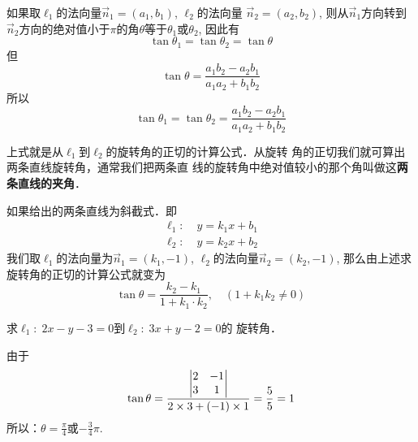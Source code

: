 \begin{figure}[htp]
    \centering
{}
    \caption{}
\end{figure}

如果取$\ell_1$的法向量$\vec{n}_1=(a_1,b_1)$, $\ell_2$的法向量
$\vec{n}_2=(a_2,b_2)$, 
则从$\vec{n}_1$方向转到$\vec{n}_2$方向的绝对值小于$\pi$的角$\theta$等于$\theta_1$或$\theta_2$, 
因此有
\[\tan\theta_1=\tan\theta_2=\tan\theta\]
但
\[\tan\theta=\frac{a_1b_2-a_2b_1}{a_1a_2+b_1b_2}\]
所以
\[\tan\theta_1=\tan\theta_2=\frac{a_1b_2-a_2b_1}{a_1a_2+b_1b_2}\]

上式就是从$\ell_1$到$\ell_2$的旋转角的正切的计算公式．从旋转
角的正切我们就可算出两条直线旋转角，通常我们把两条直
线的旋转角中绝对值较小的那个角叫做这\textbf{两条直线的夹角}．

如果给出的两条直线为斜截式．即
\[\begin{split}
    \ell_1:&\; y=k_1x+b_1\\
    \ell_2:&\; y=k_2x+b_2
  \end{split}\]
我们取$\ell_1$的法向量为$\vec{n}_1=(k_1,-1)$, $\ell_2$的法向量$\vec{n}_2=(k_2,-1)$, 
那么由上述求旋转角的正切的计算公式就变为
\[\tan\theta=\frac{k_2-k_1}{1+k_1\cdot k_2},\quad (1+k_1k_2\ne 0)\]

\begin{example}
    求$\ell_1:\; 2x-y-3=0$到$\ell_2:\; 3x+y-2=0$的
旋转角．
\end{example}

\begin{solution}
由于
\[\tan\theta=\dfrac{\begin{vmatrix}
    2&-1\\3&1
\end{vmatrix}}{2\times 3+(-1)\times 1}=\dfrac{5}{5}=1\]
所以：$\theta=\frac{\pi}{4}$或$-\frac{3}{4}\pi$.
\end{solution}

